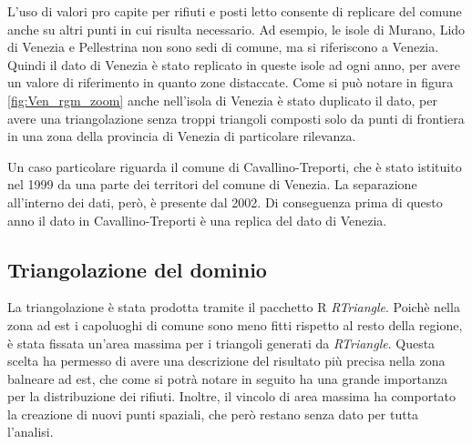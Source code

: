 \documentclass[a4paper,11pt,twoside,openright]{book}							%
\begin{document}
L'uso di valori pro capite per rifiuti e posti letto consente di replicare del comune anche su altri punti in cui risulta necessario. Ad esempio, le isole di Murano, Lido di Venezia e Pellestrina non sono sedi di comune, ma si riferiscono a Venezia. Quindi il dato di Venezia è stato replicato in queste isole ad ogni anno, per avere un valore di riferimento in quanto zone distaccate. Come si può notare in figura \ref{fig:Ven_rgm_zoom} anche nell'isola di Venezia è stato duplicato il dato, per avere una triangolazione  senza troppi triangoli composti solo da punti di frontiera in una zona della provincia di Venezia di particolare rilevanza.

Un caso particolare riguarda il comune di Cavallino-Treporti, che è stato istituito nel 1999 da una parte dei territori del comune di Venezia. La separazione all'interno dei dati, però, è presente dal 2002. Di conseguenza prima di questo anno il dato in Cavallino-Treporti è una replica del dato di Venezia.

\subsection{Triangolazione del dominio}

La triangolazione è stata prodotta tramite il pacchetto R \textit{RTriangle}. Poichè nella zona ad est i capoluoghi di comune sono meno fitti rispetto al resto della regione, è stata fissata un'area massima per i triangoli generati da \textit{RTriangle}. Questa scelta ha permesso di avere una descrizione del risultato più precisa nella zona balneare ad est, che come si potrà notare in seguito ha una grande importanza per la distribuzione dei rifiuti. Inoltre, il vincolo di area massima ha comportato la creazione di nuovi punti spaziali, che però restano senza dato per tutta l'analisi.
\end{document}
